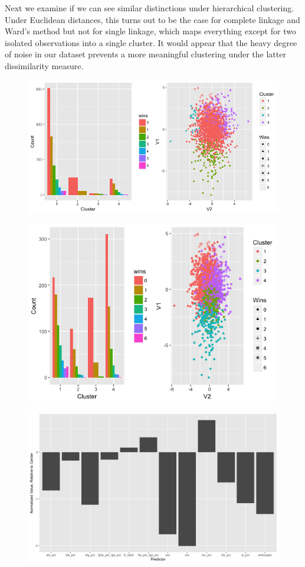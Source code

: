 \documentclass[10pt,a4paper, hidelinks]{article} %
\begin{document}


Next we examine if we can see similar distinctions under hierarchical clustering.  Under Euclidean distances, this turns out to be the case for complete linkage and Ward's method but not for single linkage, which maps everything except for two isolated observations into a single cluster.  It would appear that the heavy degree of noise in our dataset prevents a more meaningful clustering under the latter dissimilarity measure.

\begin{figure}[H]
	\centering
	\includegraphics[width=0.7\linewidth]{../fig/comp1}
\end{figure}

\begin{figure}[H]
	\centering
	\includegraphics[width=0.7\linewidth]{../fig/ward1}
\end{figure}

\begin{figure}[H]
	\centering
	\includegraphics[width=0.7\linewidth]{../fig/compweak}
\end{figure}
\end{document}
